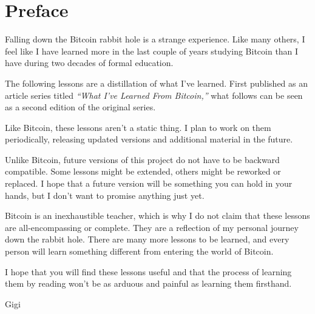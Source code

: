 \chapter*{Preface}

Falling down the Bitcoin rabbit hole is a strange experience. Like many others,
I feel like I have learned more in the last couple of years studying Bitcoin
than I have during two decades of formal education.

The following lessons are a distillation of what I’ve learned. First published
as an article series titled \textit{“What I’ve Learned From Bitcoin,”} what follows
can be seen as a second edition of the original series.

Like Bitcoin, these lessons aren't a static thing. I plan to work on them
periodically, releasing updated versions and additional material in the future.

Unlike Bitcoin, future versions of this project do not have to be backward
compatible. Some lessons might be extended, others might be reworked or
replaced. I hope that a future version will be something you can hold in your
hands, but I don’t want to promise anything just yet.

Bitcoin is an inexhaustible teacher, which is why I do not claim that these
lessons are all-encompassing or complete. They are a reflection of my personal
journey down the rabbit hole. There are many more lessons to be learned, and
every person will learn something different from entering the world of Bitcoin.

I hope that you will find these lessons useful and that the process of learning
them by reading won’t be as arduous and painful as learning them firsthand.

Gigi

%
%
